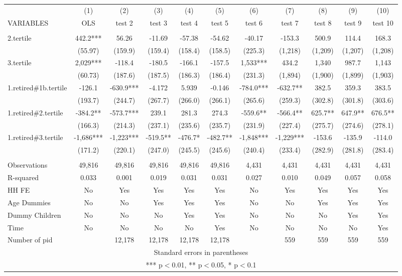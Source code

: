 \begin{tabular}{lcccccccccc} \hline
 & (1) & (2) & (3) & (4) & (5) & (6) & (7) & (8) & (9) & (10) \\
VARIABLES & OLS & test 2 & test 3 & test 4 & test 5 & test 6 & test 7 & test 8 & test 9 & test 10 \\ \hline
 &  &  &  &  &  &  &  &  &  &  \\
2.tertile & 442.2*** & 56.26 & -11.69 & -57.38 & -54.62 & -40.17 & -153.3 & 500.9 & 114.4 & 168.3 \\
 & (55.97) & (159.9) & (159.4) & (158.4) & (158.5) & (225.3) & (1,218) & (1,209) & (1,207) & (1,208) \\
3.tertile & 2,029*** & -118.4 & -180.5 & -166.1 & -157.5 & 1,533*** & 434.2 & 1,340 & 987.7 & 1,143 \\
 & (60.73) & (187.6) & (187.5) & (186.3) & (186.4) & (231.3) & (1,894) & (1,900) & (1,899) & (1,903) \\
1.retired\#1b.tertile & -126.1 & -630.9*** & -4.172 & 5.939 & -0.146 & -784.0*** & -632.7** & 382.5 & 359.3 & 383.5 \\
 & (193.7) & (244.7) & (267.7) & (266.0) & (266.1) & (265.6) & (259.3) & (302.8) & (301.8) & (303.6) \\
1.retired\#2.tertile & -384.2** & -573.7*** & 239.1 & 281.3 & 274.3 & -559.6** & -566.4** & 625.7** & 647.9** & 676.5** \\
 & (166.3) & (214.3) & (237.1) & (235.6) & (235.7) & (231.9) & (227.4) & (275.7) & (274.6) & (278.1) \\
1.retired\#3.tertile & -1,686*** & -1,223*** & -519.5** & -476.7* & -482.7** & -1,848*** & -1,229*** & -153.6 & -135.9 & -114.0 \\
 & (171.2) & (220.1) & (247.0) & (245.5) & (245.6) & (240.4) & (233.4) & (282.9) & (281.8) & (283.4) \\
 &  &  &  &  &  &  &  &  &  &  \\
Observations & 49,816 & 49,816 & 49,816 & 49,816 & 49,816 & 4,431 & 4,431 & 4,431 & 4,431 & 4,431 \\
R-squared & 0.033 & 0.001 & 0.019 & 0.031 & 0.031 & 0.027 & 0.010 & 0.049 & 0.057 & 0.058 \\
HH FE & No & Yes & Yes & Yes & Yes & No & Yes & Yes & Yes & Yes \\
Age Dummies & No & No & Yes & Yes & Yes & No & No & Yes & Yes & Yes \\
Dummy Children & No & No & No & Yes & Yes & No & No & No & Yes & Yes \\
Time & No & No & No & No & Yes & No & No & No & No & Yes \\
 Number of pid &  & 12,178 & 12,178 & 12,178 & 12,178 &  & 559 & 559 & 559 & 559 \\ \hline
\multicolumn{11}{c}{ Standard errors in parentheses} \\
\multicolumn{11}{c}{ *** p$<$0.01, ** p$<$0.05, * p$<$0.1} \\
\end{tabular}
